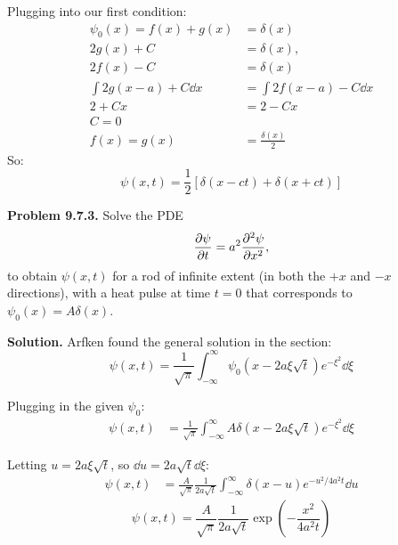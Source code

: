 \documentclass{article}
\begin{document}
Plugging into our first condition:
\begin{equation*}
\begin{aligned}
    \psi_0(x) = f(x) + g(x) &= \delta(x) \\
    2g(x) + C &= \delta(x), \\
    2f(x) - C &= \delta(x) \\
    \int 2g(x-a) + C \dd x &= \int 2f(x-a) - C \dd x \\
    2 + Cx &= 2 - Cx \\
    C = 0 \\
    f(x) = g(x) &= \frac{\delta(x)}{2}
\end{aligned}
\end{equation*}
So:
\begin{equation}
    \boxed{\psi(x,t) = \frac{1}{2}\left[\delta(x-ct) + \delta(x+ct)\right]}\tag{9.6.2}\label{eq:9.6.2}
\end{equation}

\hrulefill

\textbf{Problem 9.7.3.} Solve the PDE
\begin{equation*}
\begin{aligned}
    \pdv{\psi}{t} = a^2\pdv[2]{\psi}{x},
\end{aligned}
\end{equation*}
to obtain $\psi(x,t)$ for a rod of infinite extent (in both the $+x$ and $-x$ directions), with a heat pulse at time $t = 0$ that corresponds to $\psi_0(x) = A\delta(x)$.

\textbf{Solution.} Arfken found the general solution in the section:
\begin{equation}
    \psi(x,t) = \frac{1}{\sqrt{\pi}}\int_{-\infty}^\infty \psi_0\left(x-2a\xi\sqrt{t}\right)e^{-\xi^2} \dd\xi \tag{9.114}\label{eq:9.114}
\end{equation}

Plugging in the given $\psi_0$:
\begin{equation*}
\begin{aligned}
    \psi(x,t) &= \frac{1}{\sqrt{\pi}}\int_{-\infty}^\infty A\delta\left(x-2a\xi\sqrt{t}\right)e^{-\xi^2} \dd\xi
\end{aligned}
\end{equation*}

Letting $u = 2a\xi\sqrt{t}$, so $\dd u = 2a\sqrt{t}\dd\xi$:
\begin{equation*}
\begin{aligned}
    \psi(x,t) &= \frac{A}{\sqrt{\pi}}\frac{1}{2a\sqrt{t}}\int_{-\infty}^\infty \delta\left(x-u\right)e^{-u^2/4a^2t} \dd u
\end{aligned}
\end{equation*}
\begin{equation}
    \boxed{\psi(x,t) = \frac{A}{\sqrt{\pi}}\frac{1}{2a\sqrt{t}}\exp\left(-\frac{x^2}{4a^2t}\right)}\tag{9.7.3}\label{eq:9.7.3}
\end{equation}
\end{document}
